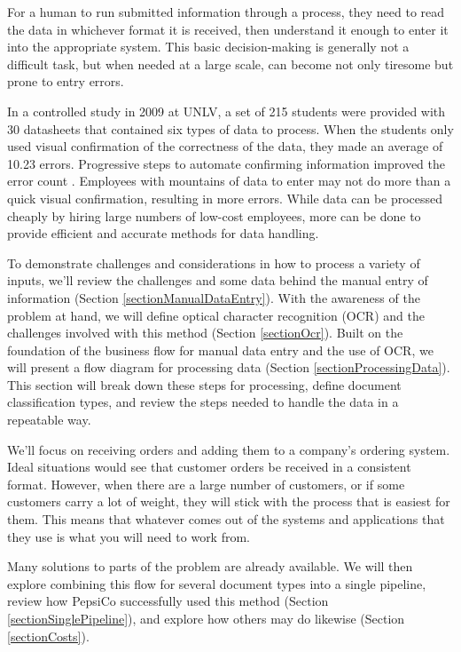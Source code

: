 \documentclass[conference, draftcls]{IEEEtran}
\begin{document}
For a human to run submitted information through a process, they need to read the data in whichever format it is received, then understand it enough to enter it into the appropriate system. This basic decision-making is generally not a difficult task, but when needed at a large scale, can become not only tiresome but prone to entry errors. 

In a controlled study in 2009 at UNLV, a set of 215 students were provided with 30 datasheets that contained six types of data to process. When the students only used visual confirmation of the correctness of the data, they made an average of 10.23 errors. Progressive steps to automate confirming information improved the error count \cite{harris2014when}. Employees with mountains of data to enter may not do more than a quick visual confirmation, resulting in more errors. While data can be processed cheaply by hiring large numbers of low-cost employees, more can be done to provide efficient and accurate methods for data handling.

To demonstrate challenges and considerations in how to process a variety of inputs, we'll review the challenges and some data behind the manual entry of information (Section \ref{sectionManualDataEntry}). With the awareness of the problem at hand, we will define optical character recognition (OCR) and the challenges involved with this method (Section \ref{sectionOcr}). Built on the foundation of the business flow for manual data entry and the use of OCR, we will present a flow diagram for processing data (Section \ref{sectionProcessingData}). This section will break down these steps for processing, define document classification types, and review the steps needed to handle the data in a repeatable way.

We'll focus on receiving orders and adding them to a company's ordering system. Ideal situations would see that customer orders be received in a consistent format. However, when there are a large number of customers, or if some customers carry a lot of weight, they will stick with the process that is easiest for them. This means that whatever comes out of the systems and applications that they use is what you will need to work from.

Many solutions to parts of the problem are already available. We will then explore combining this flow for several document types into a single pipeline, review how PepsiCo successfully used this method (Section \ref{sectionSinglePipeline}), and explore how others may do likewise (Section \ref{sectionCosts}).
\end{document}
